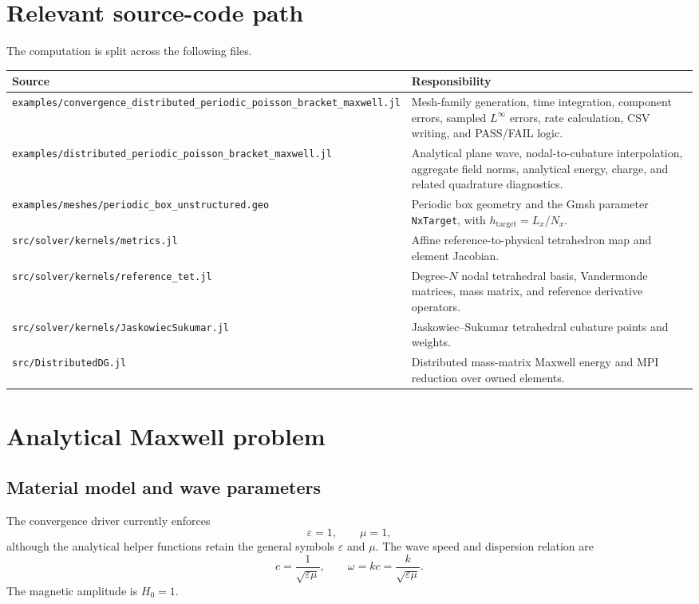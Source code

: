 \documentclass[11pt]{article}
\newcommand{\code}[1]{\nolinkurl{#1}}
\begin{document}
\section{Relevant source-code path}

The computation is split across the following files.

\begin{longtable}{>{\raggedright\arraybackslash}p{}
                  >{\raggedright\arraybackslash}p{}}
\toprule
Source & Responsibility \\
\midrule
\endhead
\code{examples/convergence_distributed_periodic_poisson_bracket_maxwell.jl}
&
Mesh-family generation, time integration, component errors, sampled
\(L^\infty\) errors, rate calculation, CSV writing, and PASS/FAIL logic.
\\
\code{examples/distributed_periodic_poisson_bracket_maxwell.jl}
&
Analytical plane wave, nodal-to-cubature interpolation, aggregate field
norms, analytical energy, charge, and related quadrature diagnostics.
\\
\code{examples/meshes/periodic_box_unstructured.geo}
&
Periodic box geometry and the Gmsh parameter
\code{NxTarget}, with \(h_{\mathrm{target}}=L_x/N_x\).
\\
\code{src/solver/kernels/metrics.jl}
&
Affine reference-to-physical tetrahedron map and element Jacobian.
\\
\code{src/solver/kernels/reference_tet.jl}
&
Degree-\(N\) nodal tetrahedral basis, Vandermonde matrices, mass matrix, and
reference derivative operators.
\\
\code{src/solver/kernels/JaskowiecSukumar.jl}
&
Jaskowiec--Sukumar tetrahedral cubature points and weights.
\\
\code{src/DistributedDG.jl}
&
Distributed mass-matrix Maxwell energy and MPI reduction over owned
elements.
\\
\bottomrule
\end{longtable}

\section{Analytical Maxwell problem}

\subsection{Material model and wave parameters}

The convergence driver currently enforces
\[
  \varepsilon=1,\qquad \mu=1,
\]
although the analytical helper functions retain the general symbols
\(\varepsilon\) and \(\mu\). The wave speed and dispersion relation are
\[
  c=\frac{1}{\sqrt{\varepsilon\mu}},
  \qquad
  \omega = kc = \frac{k}{\sqrt{\varepsilon\mu}}.
\]
The magnetic amplitude is \(H_0=1\).
\end{document}
